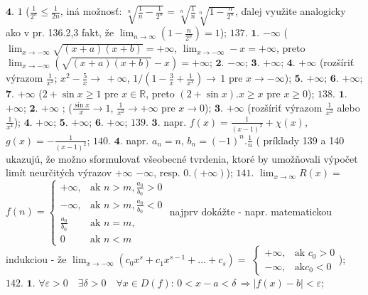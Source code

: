 $\boldsymbol{4.}$  $1 $  ($\frac{1}{2^{n}}\leq \frac{1}{2n} $, iná možnosť:  $\sqrt[n]{\frac{1}{n}-\frac{1}{2^{n}}}= \sqrt[n]{\frac{1}{n}}\sqrt[n]{1-\frac{n}{2^{n}}} $, ďalej využite analogicky ako v pr. 136.2,3 fakt, že $\lim_{n\rightarrow\infty} (1-\frac{n}{2^{n}})=1$);
$\boxed{137.}$
$\boldsymbol{1.}$  $-\infty$  ($\lim_{x\rightarrow-\infty} \sqrt{(x+a)(x+b)}=+\infty$, $\lim_{x\rightarrow-\infty} -x = + \infty$, preto $\lim_{x\rightarrow-\infty}( \sqrt{(x+a)(x+b)}-x)=+\infty$;
$\boldsymbol{2.}$  $-\infty$;
$\boldsymbol{3.}$  $+\infty$;
$\boldsymbol{4.}$  $+\infty$ (rozšíriť výrazom $\frac{1}{x^{2}} $; $x^{2}-\frac{5}{x}\rightarrow \, +\infty $, $1/(1-\frac{3}{x}+\frac{1}{x^{2}}) \rightarrow \, 1 $ pre  $x\rightarrow -\infty $);
$\boldsymbol{5.}$  $+\infty$;
$\boldsymbol{6.}$  $+\infty$;
$\boldsymbol{7.}$  $+\infty$ ($2+ \sin x \geq 1 $ pre $x \in \mathbb{R} $, preto $(2+ \sin x).x\geq x $ pre $x\geq0 $);
$\boxed{138.}$
$\boldsymbol{1.}$  $+\infty$;
$\boldsymbol{2.}$  $+\infty$ ; ($\frac{\sin x}{x}\rightarrow 1$,  $\frac{1}{x^{2}}\rightarrow +\infty$ pre $x\rightarrow 0 $);
$\boldsymbol{3.}$  $+\infty$ (rozšíriť výrazom $\frac{1}{x^{2}} $  alebo $\frac{1}{x^{4}} $);
$\boldsymbol{4.}$  $+\infty$;
$\boldsymbol{5.}$  $+\infty$;
$\boldsymbol{6.}$  $+\infty$;
$\boxed{139.}$  $\boldsymbol{3.}$ napr.  $f(x)= \frac{1}{(x-1)^{2}}+ \chi (x) $, $g(x)= -\frac{1}{(x-1)^{2}} $;
$\boxed{140.}$
$\boldsymbol{4.}$ napr. $a_{n}=n, \, b_{n}=(-1)^{n}. \frac{1}{n} $ ( príklady 139 a 140 ukazujú, že možno sformulovať všeobecné tvrdenia, ktoré by umožňovali výpočet limít neurčitých výrazov $ +\infty$ $ -\infty $, resp. $0.(+\infty) $);
$\boxed{141.}$ 
$\lim_{x\rightarrow\infty} R(x) =$ $ f(n)=\left\{\begin{matrix} +\infty, & \mbox{ak }n>m, \frac{a_{0}}{b_{0}}>0 \\ -\infty, & \mbox{ak }n>m, \frac{a_{0}}{b_{0}}<0 \\ \frac{a_{0}}{b_{0}} & \mbox {ak }n=m, \\ 0 & \mbox {ak }n<m\end{matrix}\right.$
najprv dokážte - napr. matematickou indukciou - že $\lim_{x\rightarrow-\infty}(c_{0}x^{s}+c_{1}x^{s-1}+...+c_{s})=$ 
$\left\{\begin{matrix} +\infty, & \mbox{ak } c_{0}>0 \\ - \infty, & \mbox{ak} c_{0}<0\end{matrix}\right. $);
$\boxed{142.}$
$\boldsymbol{1.}$
$\forall \varepsilon >0 \quad \exists \delta >0 \quad \forall x \in D(f): \, 0< x-a < \delta \, \Rightarrow \vert f(x) - b \vert < \varepsilon$;
